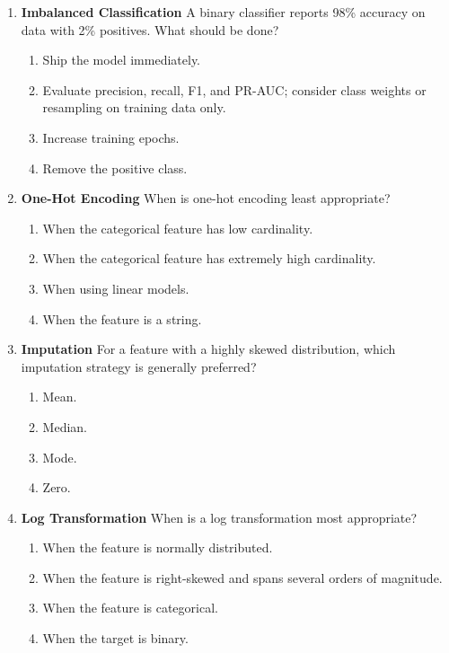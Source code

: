 \documentclass{article}
\begin{document}
\begin{enumerate}[label=\textbf{Q\arabic*.}]
		\item \textbf{Imbalanced Classification}
		A binary classifier reports 98\% accuracy on data with 2\% positives. What should be done?
		\begin{enumerate}[label=\Alph*.]
			\item Ship the model immediately.
			\item Evaluate precision, recall, F1, and PR-AUC; consider class weights or resampling on training data only.
			\item Increase training epochs.
			\item Remove the positive class.
		\end{enumerate}
		
		\item \textbf{One-Hot Encoding}
		When is one-hot encoding least appropriate?
		\begin{enumerate}[label=\Alph*.]
			\item When the categorical feature has low cardinality.
			\item When the categorical feature has extremely high cardinality.
			\item When using linear models.
			\item When the feature is a string.
		\end{enumerate}
		
		\item \textbf{Imputation}
		For a feature with a highly skewed distribution, which imputation strategy is generally preferred?
		\begin{enumerate}[label=\Alph*.]
			\item Mean.
			\item Median.
			\item Mode.
			\item Zero.
		\end{enumerate}
		
		\item \textbf{Log Transformation}
		When is a log transformation most appropriate?
		\begin{enumerate}[label=\Alph*.]
			\item When the feature is normally distributed.
			\item When the feature is right-skewed and spans several orders of magnitude.
			\item When the feature is categorical.
			\item When the target is binary.
		\end{enumerate}
		

\end{enumerate}
\end{document}
